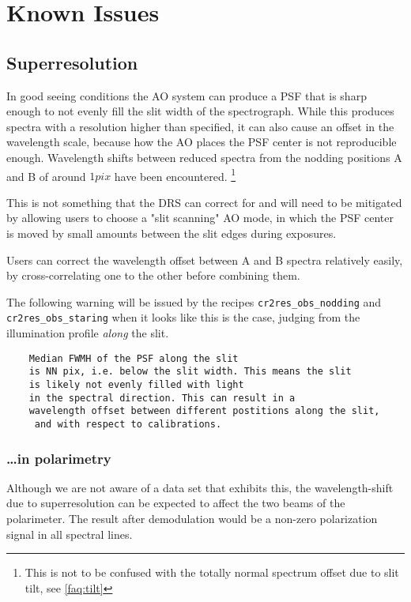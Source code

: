 \section{Known Issues}
\label{sec:knownissues}

\subsection{Superresolution}

In good seeing conditions the AO system can produce a PSF that is sharp enough
to not evenly fill the slit width of the spectrograph. While this produces
spectra with a resolution higher than specified, it can also cause an offset in
the wavelength scale, because how the AO places the PSF center is not
reproducible enough. Wavelength shifts between reduced spectra from the nodding
positions A and B of around $1 pix$ have been encountered.
\footnote{This is not to be confused with the totally normal spectrum offset
due to slit tilt, see \ref{faq:tilt}}

This is not something that the DRS can correct for and will need to be mitigated
by allowing users to choose a "slit scanning" AO mode, in which the PSF center
is moved by small amounts between the slit edges during exposures.

Users can correct the wavelength offset between A and B spectra relatively
easily, by cross-correlating one to the other before combining them.

The following warning will be issued by the recipes \verb!cr2res_obs_nodding!
and \verb!cr2res_obs_staring! when it looks like this is the case, judging from
the illumination profile \emph{along} the slit. 
\begin{verbatim}
    Median FWMH of the PSF along the slit 
    is NN pix, i.e. below the slit width. This means the slit 
    is likely not evenly filled with light 
    in the spectral direction. This can result in a 
    wavelength offset between different postitions along the slit,
     and with respect to calibrations.
\end{verbatim}

\subsubsection{\ldots in polarimetry}

Although we are not aware of a data set that exhibits this, the wavelength-shift
due to superresolution can be expected to affect the two beams of the
polarimeter. The result after demodulation would be a non-zero polarization
signal in all spectral lines.

